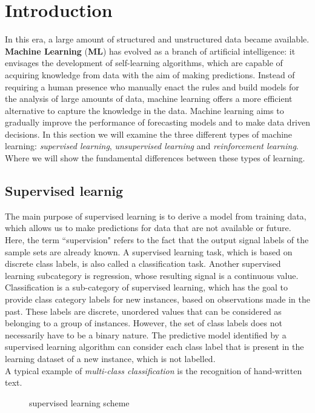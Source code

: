 \section{Introduction}
\label{sec:intro}
In this era, a large amount of structured and unstructured data became available.
\textbf{Machine Learning} (\textbf{ML}) has evolved as a branch of artificial
intelligence: it envisages the development of self-learning algorithms, which are
capable of acquiring knowledge from data with the aim of making predictions.
Instead of requiring a human presence who manually enact the rules and
build models for the analysis of large amounts of data, machine learning offers
a more efficient alternative to capture the knowledge in the data. Machine learning
aims to gradually improve the performance of forecasting models and
to make data driven decisions.
In this section we will examine the three different types of machine learning:
\emph{supervised learning}, \emph{unsupervised learning} and
\emph{reinforcement learning}.
Where we will show the fundamental differences between these types of
learning.\cite{raschka2016machine}
%
\subsection{Supervised learnig}
\label{subsec:supervised-learnig}
The main purpose of supervised learning is to derive a model from 
training data, which allows us to make predictions for data that are not
available or future.
Here, the term ``supervision" refers to the fact that the output signal labels of the
sample sets are already known.
A supervised learning task, which is based on discrete class labels, is also called a
classification task.
Another supervised learning subcategory is regression, whose resulting
signal is a continuous value.
Classification is a sub-category of supervised learning, which has the goal to
provide class category labels for new instances, based on observations made in
the past.
These labels are discrete, unordered values ​​that can be considered as
belonging to a group of instances.
However, the set of class labels does not necessarily have to be a binary
nature.
The predictive model identified by a supervised learning algorithm can consider
each class label that is present in the learning dataset of a new instance, which
is not labelled.\\
A typical example of \emph{multi-class classification} is the recognition of
hand-written text.\cite{raschka2016machine}
%
\begin{figure}[!h]
\centering
{} 
\caption{supervised learning scheme} 
\label{fig:supervised-learning-scheme}
\end{figure}
%
